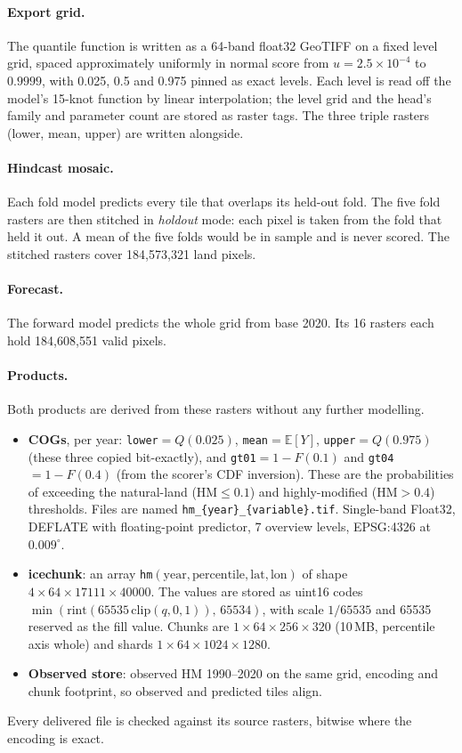 \documentclass[11pt,a4paper]{article}
\newcommand{\HM}{\mathrm{HM}}
\newcommand{\code}[1]{\texttt{\small #1}}
\newcommand{\E}{\mathbb{E}}
\begin{document}
\paragraph{Export grid.} The quantile function is written as a 64-band float32 GeoTIFF on a fixed
level grid, spaced approximately uniformly in normal score from $u=2.5\times10^{-4}$ to $0.9999$,
with 0.025, 0.5 and 0.975 pinned as exact levels. Each level is read off the model's 15-knot
function by linear interpolation; the level grid and the head's family and parameter count are
stored as raster tags. The three triple rasters (lower, mean, upper) are written alongside.

\paragraph{Hindcast mosaic.} Each fold model predicts every tile that overlaps its held-out fold.
The five fold rasters are then stitched in \emph{holdout} mode: each pixel is taken from the fold
that held it out. A mean of the five folds would be in sample and is never scored. The stitched
rasters cover 184,573,321 land pixels.

\paragraph{Forecast.} The forward model predicts the whole grid from base 2020. Its 16 rasters
each hold 184,608,551 valid pixels.

\paragraph{Products.} Both products are derived from these rasters without any further modelling.
\begin{itemize}
\item \textbf{COGs}, per year: \code{lower}${}=Q(0.025)$, \code{mean}${}=\E[Y]$,
  \code{upper}${}=Q(0.975)$ (these three copied bit-exactly), and \code{gt01}${}=1-F(0.1)$ and
  \code{gt04}${}=1-F(0.4)$ (from the scorer's CDF inversion). These are the probabilities of
  exceeding the natural-land ($\HM\le0.1$) and highly-modified ($\HM>0.4$) thresholds. Files are
  named \code{hm\_\{year\}\_\{variable\}.tif}. Single-band Float32, DEFLATE with
  floating-point predictor, 7 overview levels, EPSG:4326 at $0.009^\circ$.
\item \textbf{icechunk}: an array \code{hm}$(\text{year},\text{percentile},\text{lat},\text{lon})$ of
  shape $4\times64\times17111\times40000$. The values are stored as uint16 codes
  $\min(\mathrm{rint}(65535\,\mathrm{clip}(q,0,1)),\,65534)$, with scale $1/65535$ and 65535
  reserved as the fill value. Chunks are $1\times64\times256\times320$ (10\,MB, percentile axis
  whole) and shards $1\times64\times1024\times1280$.
\item \textbf{Observed store}: observed HM 1990--2020 on the same grid, encoding and chunk
  footprint, so observed and predicted tiles align.
\end{itemize}
Every delivered file is checked against its source rasters, bitwise where the encoding is exact.
\end{document}
